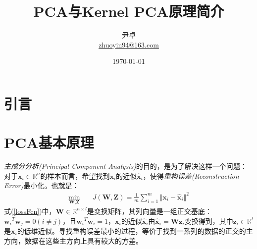 \documentclass[UTF8, 12pt]{ctexart}
\begin{document}
\title{\heiti \Huge{PCA与Kernel PCA原理简介}}
\author{\kaishu 尹卓 \\ \href{mailto:zhuoyin94@163.com}{zhuoyin94@163.com}}
\date{\today}
\maketitle

\tableofcontents
\newpage

\section{引言}

\section{PCA基本原理}
	\emph{主成分分析(Principal Component Analysis)}的目的，是为了解决这样一个问题：对于$\textbf{x}_{i} \in \mathbb{R}^{n}$的样本而言，希望找到$\textbf{x}_{i}$的近似$\hat{\textbf{x}}_{i}$，使得\emph{重构误差(Reconstruction Error)}最小化。也就是：
	\begin{align}
		\label{lossFcn}
		\min_{\textbf{W}, \textbf{Z}} & \quad J(\textbf{W}, \textbf{Z}) = \frac{1}{m} \sum_{i=1}^{m} {\Vert \textbf{x}_{i} - \hat{\textbf{x}}_{i} \Vert}^{2}
	\end{align}
	式(\ref{lossFcn})中，$\textbf{W} \in \mathbb{R}^{n \times l}$是变换矩阵，其列向量是一组正交基底：${\textbf{w}_{i}}^{T}\textbf{w}_{j}=0(i \neq j)$，且${\textbf{w}_{i}}^{T}\textbf{w}_{i}=1$，$\textbf{x}_{i}$的近似$\hat{\textbf{x}}_{i}$由$\hat{\textbf{x}}_{i} = \textbf{W}\textbf{z}_{i}$变换得到，其中$\textbf{z}_{i} \in \mathbb{R}^{l}$是$\textbf{x}_{i}$的低维近似。寻找重构误差最小的过程，等价于找到一系列的数据的正交的主方向，数据在这些主方向上具有较大的方差。
	
\end{document}
